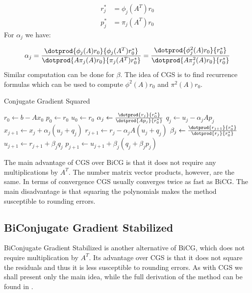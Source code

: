 \begin{align}
	r^*_j &= \phi_j(A^T)r_0 \\
	p^*_j &= \pi_j(A^T)r_0
\end{align}
For $\alpha_{j}$ we have:

\begin{equation}
\alpha_j = \frac{\dotprod{\phi_j(A)r_0}{\phi_j(A^T)r^*_0}}{\dotprod{A\pi_j(A)r_0}{\pi_j(A^T)r^*_0}} = \frac{\dotprod{\phi^2_j(A)r_0}{r^*_0}}{\dotprod{A\pi^2_j(A)r_0}{r^*_0}}
\end{equation}
Similar computation can be done for $\beta$. The idea of CGS is to find recurrence formulas which can be used to compute $\phi^2(A)r_0$ and $\pi^2(A)r_0$.

\begin{algorithm}[H]
 \centering
 \caption{Conjugate Gradient Squared}\label{alg:CGC}
 \begin{algorithmic}[1]
			\State $r_0 \gets b - Ax_0$
			\State $p_0 \gets r_0$
			\State $u_0 \gets r_0$
				\State $\alpha_j \gets \frac{\dotprod{r_j}{r^*_0}}{\dotprod{Ap_j}{r^*_0}}$
				\State $q_j \gets u_j - \alpha_j A p_j$
				\State $x_{j+1} \gets x_j + \alpha_j(u_j + q_j)$
				\State $r_{j+1} \gets r_j - \alpha_j A (u_j + q_j)$
				\State $\beta_j \gets \frac{\dotprod{r_{j+1}}{r^*_0}}{\dotprod{r_j}{r^*_0}}$
				\State $u_{j+1} \gets r_{j+1} + \beta_j q_j$
				\State $p_{j+1} \gets u_{j+1} + \beta_j(q_j + \beta_j p_j)$
			\EndFor
		\EndProcedure
 \end{algorithmic}
\end{algorithm}

The main advantage of CGS over BiCG is that it does not require any multiplications by $A^T$. The number matrix vector products, however, are the same. In terms of convergence CGS usually converges twice as fast as BiCG. The main disadvantage is that squaring the polynomials makes the method susceptible to rounding errors.

\subsection{BiConjugate Gradient Stabilized}
BiConjugate Gradient Stabilized is another alternative of BiCG, which does not require multiplication by $A^T$. Its advantage over CGS is that it does not square the residuals and thus it is less susceptible to rounding errors. As with CGS we shall present only the main idea, while the full derivation of the method can be found in \cite{saad-sparse}.

